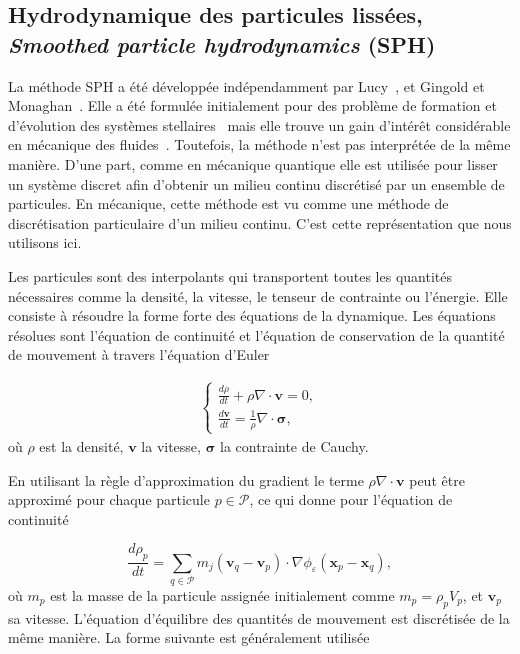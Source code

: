 \subsection{Hydrodynamique des particules lissées, \textit{Smoothed particle hydrodynamics} (SPH)}

La méthode SPH a été développée indépendamment par Lucy~\cite{lucy_1977}, et Gingold et Monaghan~\cite{gingold_monaghan_sph_1977}. Elle a été formulée initialement pour des problème de formation et d'évolution des systèmes stellaires~\cite{hultman1999hierarchical} mais elle trouve un gain d'intérêt considérable en mécanique des fluides~\cite{PhysRevE.52.4899, SHADLOO201611}. Toutefois, la méthode n'est pas interprétée de la même manière. D'une part, comme en mécanique quantique elle est utilisée pour lisser un système discret afin d'obtenir un milieu continu discrétisé par un ensemble de particules. En mécanique, cette méthode est vu comme une méthode de discrétisation particulaire d'un milieu continu. C'est cette représentation que nous utilisons ici.

Les particules sont des interpolants qui transportent toutes les quantités nécessaires comme la densité, la vitesse, le tenseur de contrainte ou l'énergie. Elle consiste à résoudre la forme forte des équations de la dynamique. Les équations résolues sont l'équation de continuité et l'équation de conservation de la quantité de mouvement à travers l'équation d'Euler

\begin{gather*}
    \left\{\begin{aligned}
        \frac{d\rho}{dt} + \rho \nabla \cdot \bm{v} = 0, \\
        \frac{d\bm v}{dt} = \frac1\rho \nabla \cdot \bm \sigma,
    \end{aligned} \right.
\end{gather*}où $\rho$ est la densité, $\bm v$ la vitesse, $\bm \sigma$ la contrainte de Cauchy.

En utilisant la règle d'approximation du gradient le terme $\rho \nabla \cdot \bm{v}$ peut être approximé pour chaque particule $p \in \mathcal P$, ce qui donne pour l'équation de continuité

\begin{equation*}
    \frac{d\rho_p}{dt} = \sum_{q \in \mathcal P} m_j (\bm v_q - \bm v_p) \cdot \nabla \phi_\varepsilon(\bm x_p - \bm x_q),
\end{equation*}où $m_p$ est la masse de la particule assignée initialement comme $m_p = \rho_p V_p$, et $\bm v_p$ sa vitesse. L'équation d'équilibre des quantités de mouvement est discrétisée de la même manière. La forme suivante est généralement utilisée

